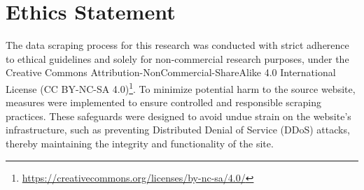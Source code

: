\section*{Ethics Statement}
 
The data scraping process for this research was conducted with strict adherence to ethical guidelines and solely for non-commercial research purposes, under the Creative Commons Attribution-NonCommercial-ShareAlike 4.0 International License (CC BY-NC-SA 4.0)\footnote{\url{https://creativecommons.org/licenses/by-nc-sa/4.0/}}. To minimize potential harm to the source website, measures were implemented to ensure controlled and responsible scraping practices. These safeguards were designed to avoid undue strain on the website’s infrastructure, such as preventing Distributed Denial of Service (DDoS) attacks, thereby maintaining the integrity and functionality of the site.
